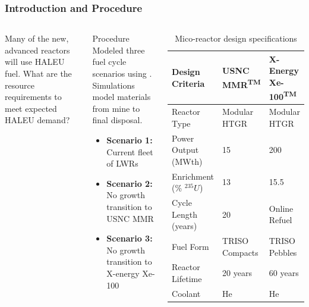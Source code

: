 \begin{frame}
  \frametitle{Introduction and Procedure}
  \begin{columns}
        \column[t]{5cm}
        Many of the new, advanced reactors will use \gls{HALEU} fuel. 
        What are the resource requirements to meet expected \gls{HALEU}
        demand?

        \begin{block}{Procedure}
            Modeled three fuel cycle scenarios using \Cyclus. Simulations 
            model materials from mine to final disposal.
            \begin{itemize}
                \item \textbf{Scenario 1:} Current fleet of \glspl{LWR}
                \item \textbf{Scenario 2:} No growth transition to \gls{USNC} \gls{MMR}
                \item \textbf{Scenario 3:} No growth transition to X-energy Xe-100
            \end{itemize}
 
        \end{block}
        
        \column[t]{5cm}
        \begingroup
        \renewcommand{\arraystretch}{1.5} %
        \begin{table}[t!]
            \tiny
            \caption{Mico-reactor design specifications}
            \label{tab:reactor_summary}
            \begin{tabular}{ p{1.5cm} p{1.5cm} p{1.25cm}}
                \hline
                Design Criteria & \gls{USNC} \gls{MMR}\textsuperscript{TM} & 
                    X-Energy Xe-100\textsuperscript{TM} \\\hline
                
                Reactor Type & Modular HTGR & Modular HTGR \\
                Power Output (MWth) & 15 & 200 \\
                Enrichment (\% $^{235}U$) & 13 & 15.5 \\
                Cycle Length (years) & 20 & Online Refuel\\
                Fuel Form & TRISO Compacts & TRISO Pebbles\\
                Reactor Lifetime & 20 years & 60 years \\
                Coolant & He & He \\
                \hline
            \end{tabular}
        \end{table}   
        \endgroup
  \end{columns}
        
\end{frame}

